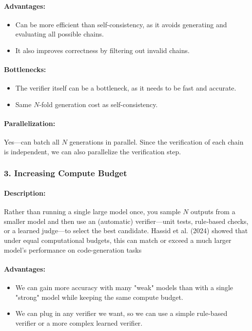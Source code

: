 \documentclass[12pt]{article}
\begin{document}
\paragraph{Advantages:}
\begin{itemize}
    \item Can be more efficient than self-consistency, as it avoids generating and evaluating all possible chains.
    \item It also improves correctness by filtering out invalid chains. 
\end{itemize}
\paragraph{Bottlenecks:}
\begin{itemize}
    \item The verifier itself can be a bottleneck, as it needs to be fast and accurate.
    \item Same $N$-fold generation cost as self-consistency.    
\end{itemize}
\paragraph{Parallelization:}
Yes—can batch all $N$ generations in parallel. Since the verification of each chain is independent, we can also parallelize the verification step.

\subsubsection*{3. Increasing Compute Budget}
\paragraph{Description:}
Rather than running a single large model once, you sample $N$ outputs from a smaller model and then use an (automatic) verifier—unit tests, rule‐based checks, or a learned
judge—to select the best candidate. Hassid et al. (2024) showed that under equal computational budgets, this can match or exceed a much larger model’s performance on code-generation tasks 

\paragraph{Advantages:}
\begin{itemize}
    \item We can gain more accuracy with many "weak" models than with a single "strong" model while keeping the same compute budget.
    \item We can plug in any verifier we want, so we can use a simple rule-based verifier or a more complex learned verifier.
\end{itemize}
\end{document}
